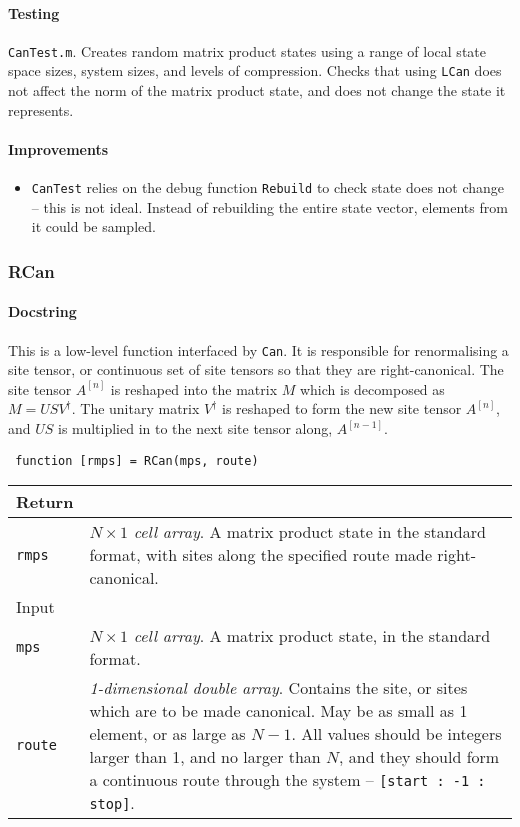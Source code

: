  \paragraph{Testing}
 \lstinline$CanTest.m$. Creates random matrix product states using a range of local state space sizes, system sizes, and levels of compression. Checks that using \lstinline$LCan$ does not affect the norm of the matrix product state, and does not change the state it represents.
 \paragraph{Improvements}
 \begin{itemize}
 \item \lstinline$CanTest$ relies on the debug function \lstinline$Rebuild$ to check state does not change -- this is not ideal. Instead of rebuilding the entire state vector, elements from it could be sampled.
 \end{itemize}



 \subsubsection{RCan}
 \paragraph{Docstring} This is a low-level function interfaced by \lstinline$Can$. It is responsible for renormalising a site tensor, or continuous set of site tensors so that they are right-canonical. The site tensor \(A^{[n]}\) is reshaped into the matrix \(M\) which is decomposed as \(M = USV^{\dagger}\). The unitary matrix \(V^{\dagger}\) is reshaped to form the new site tensor \(A^{[n]}\), and \(US\) is multiplied in to the next site tensor along, \(A^{[n-1]}\).
 \begin{lstlisting}
 function [rmps] = RCan(mps, route) \end{lstlisting}
 \begin{longtabu}{X[1,l]X[4,l]}
 \hline
 Return & \\ \hline
 \lstinline$rmps$ & \emph{\(N \times 1\) cell array}. A matrix product state in the standard format, with sites along the specified route made right-canonical. \\ \hline
 Input & \\ \hline
 \lstinline$mps$ & \emph{\(N \times 1\) cell array}. A matrix product state, in the standard format. \\
 \lstinline$route$ & \emph{1-dimensional double array}. Contains the site, or sites which are to be made canonical. May be as small as 1 element, or as large as \(N - 1\). All values should be integers larger than 1, and no larger than \(N\), and they should form a continuous route through the system -- \lstinline$[start : -1 : stop]$. \\
 \hline
 \end{longtabu}
